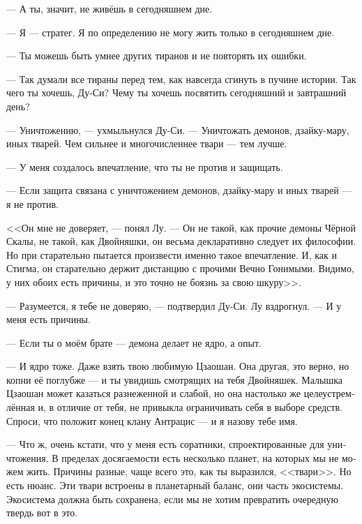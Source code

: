 \documentclass[a4paper,12pt,fleqn]{book}\usepackage{polyglossia}\setdefaultlanguage[babelshorthands=true]{russian}\setotherlanguage{english}\defaultfontfeatures{Ligatures=TeX,Mapping=tex-text}\usepackage{xcolor}\newcommand{\ml}[3]{#2}
\begin{document}
{--- А ты, значит, не живёшь в сегодняшнем дне.

--- Я --- стратег.
Я по определению не могу жить только в сегодняшнем дне.

--- Ты можешь быть умнее других тиранов и не повторять их ошибки.

--- Так думали все тираны перед тем, как навсегда сгинуть в пучине истории.
Так чего ты хочешь, Ду-Си?
Чему ты хочешь посвятить сегодняшний и завтрашний день?

--- Уничтожению, --- ухмыльнулся Ду-Си.
\ml{$0$}
{--- Уничтожать демонов, дзайку-мару, иных тварей.}
{``Destruction of daemons, dzaiku-maru, other beasts.}
\ml{$0$}
{Чем сильнее и многочисленнее твари --- тем лучше.}
{The stronger they are, the bigger their numbers, the better to me.''}

\ml{$0$}
{--- У меня создалось впечатление, что ты не против и защищать.}
{``I got the impression that you're good at protection too.''}

\ml{$0$}
{--- Если защита связана с уничтожением демонов, дзайку-мару и иных тварей --- я не против.}
{``If protection has anything to do with destruction of daemons, dzaiku-maru, or other beasts---I'm in.''}

<<Он мне не доверяет, --- понял Лу.
--- Он не такой, как прочие демоны Чёрной Скалы, не такой, как Двойняшки, он весьма декларативно следует их философии.
Но при старательно пытается произвести именно такое впечатление.
И, как и Стигма, он старательно держит дистанцию с прочими Вечно Гонимыми.
Видимо, у них обоих есть причины, и это точно не боязнь за свою шкуру>>.

--- Разумеется, я тебе не доверяю, --- подтвердил Ду-Си.
Лу вздрогнул.
--- И у меня есть причины.

--- Если ты о моём брате --- демона делает не ядро, а опыт.

--- И ядро тоже.
Даже взять твою любимую Цзаошан.
Она другая, это верно, но копни её поглубже --- и ты увидишь смотрящих на тебя Двойняшек.
Малышка Цзаошан может казаться разнеженной и слабой, но она настолько же целеустремлённая и, в отличие от тебя, не привыкла ограничивать себя в выборе средств.
\ml{$0$}
{Спроси, что положит конец клану Антрацис --- и я назову тебе имя.}
{Ask me what shall be the end of Anthracis, and I tell you the name.''}

\ml{$0$}
{--- Что ж, очень кстати, что у меня есть соратники, спроектированные для уничтожения.}
{``Well, it's very useful to have such destructors by design as companions.}
В пределах досягаемости есть несколько планет, на которых мы не можем жить.
\ml{$0$}
{Причины разные, чаще всего это, как ты выразился, <<твари>>.}
{Reasons differ, and mostly it is, as you said, `beasts'.}
Но есть нюанс.
Эти твари встроены в планетарный баланс, они часть экосистемы.
Экосистема должна быть сохранена, если мы не хотим превратить очередную твердь вот в это.

}
\end{document}
